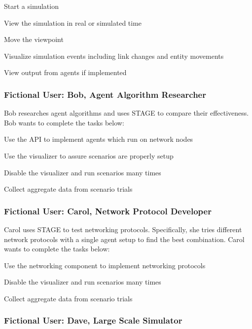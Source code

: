 \documentclass[titlepage]{article}
\begin{document}
\begin{itemize*}
    \item Start a simulation
    \item View the simulation in real or simulated time
    \item Move the viewpoint
    \item Visualize simulation events including link changes and entity movements
    \item View output from agents if implemented
\end{itemize*}

\subsubsection{Fictional User: Bob, Agent Algorithm Researcher%
  \label{bob}%
}

Bob researches agent algorithms and uses STAGE to compare their effectiveness.  Bob wants to complete the tasks below:

\begin{itemize*}
    \item Use the API to implement agents which run on network nodes
    \item Use the visualizer to assure scenarios are properly setup
    \item Disable the visualizer and run scenarios many times
    \item Collect aggregate data from scenario trials
\end{itemize*}

\subsubsection{Fictional User: Carol, Network Protocol Developer%
  \label{bob}%
}

Carol uses STAGE to test networking protocols.  Specifically, she tries different network protocols with a single agent
setup to find the best combination.  Carol wants to complete the tasks below:

\begin{itemize*}
    \item Use the networking component to implement networking protocols
    \item Disable the visualizer and run scenarios many times
    \item Collect aggregate data from scenario trials
\end{itemize*}

\subsubsection{Fictional User: Dave, Large Scale Simulator%
  \label{bob}%
}
\end{document}
